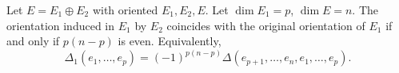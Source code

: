 Let $E = E_1 \oplus E_2$ with oriented $E_1, E_2, E$. Let $\dim E_1 = p$, $\dim E = n$. The orientation induced in $E_1$ by $E_2$ coincides with the original orientation of $E_1$ if and only if $p(n-p)$ is even. Equivalently,
$$\Delta_1(e_1, \ldots, e_p) = (-1)^{p(n-p)} \Delta(e_{p+1}, \ldots, e_n, e_1, \ldots, e_p).$$
